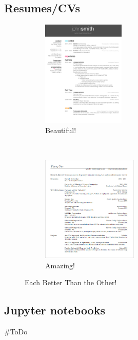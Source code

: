 \documentclass[11pt,letterpaper,titlepage]{article}
\numberwithin{equation}{section}
\numberwithin{figure}{section}
\numberwithin{table}{section}
\numberwithin{algorithm}{section}
\theoremstyle{definition}
\begin{document}
 \subsection{Resumes/CVs}
    
\begin{figure}[H]
    \centering
    \begin{subfigure}{0.45\textwidth}
        \centering
        \includegraphics[height=2in]{cv_101}
        \caption{Beautiful!}
        \label{fig:left}
    \end{subfigure}
    ~
    \begin{subfigure}{0.45\textwidth}
        \centering
        \includegraphics[height=2in]{cv_102}
        \caption{Amazing!}
        \label{fig:right}
    \end{subfigure}
    \caption{Each Better Than the Other!}
    \label{fig:combined}
\end{figure}

\subsection{Jupyter notebooks}
    \#ToDo
\end{document}
